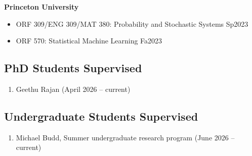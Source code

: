 \documentclass[11pt]{article}
\begin{document}
	\noindent\textbf{Princeton University}
	
	\begin{itemize}[leftmargin=0pt, label={}]
		\item ORF 309/ENG 309/MAT 380: Probability and Stochastic Systems \hfill Sp2023
		
		\item ORF 570: Statistical Machine Learning \hfill Fa2023
	\end{itemize}
	
	
	\subsection*{PhD Students Supervised}
	
	\begin{enumerate}
		\item Geethu Rajan (April 2026 -- current)
	\end{enumerate}
	
	\subsection*{Undergraduate Students Supervised}
	
	\begin{enumerate}
		\item Michael Budd, Summer undergraduate research program (June 2026 -- current)
	\end{enumerate}
	
\end{document}
